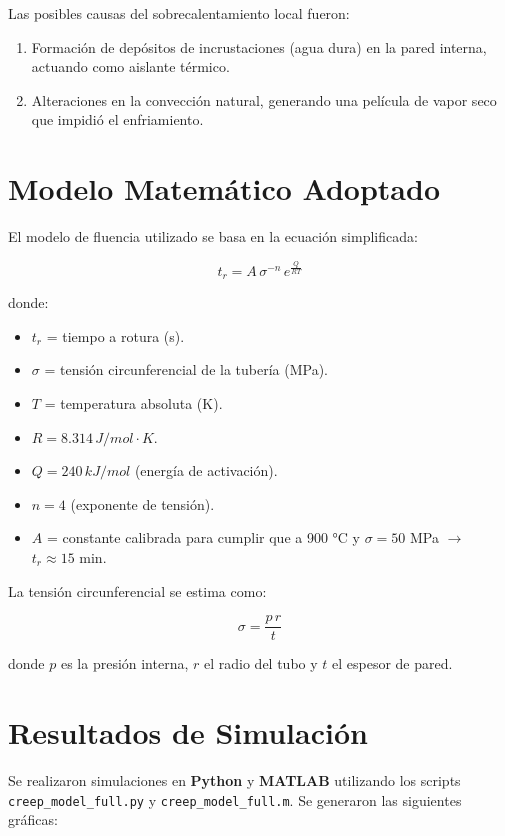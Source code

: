 \documentclass[12pt,a4paper]{article}
\begin{document}
Las posibles causas del sobrecalentamiento local fueron:
\begin{enumerate}
    \item Formación de depósitos de incrustaciones (agua dura) en la pared interna, actuando como aislante térmico.
    \item Alteraciones en la convección natural, generando una película de vapor seco que impidió el enfriamiento.
\end{enumerate}

\section{Modelo Matemático Adoptado}
El modelo de fluencia utilizado se basa en la ecuación simplificada:

\begin{equation}
    t_r = A \, \sigma^{-n} \, e^{\frac{Q}{R T}}
\end{equation}

donde:
\begin{itemize}
    \item $t_r$ = tiempo a rotura (s).
    \item $\sigma$ = tensión circunferencial de la tubería (MPa).
    \item $T$ = temperatura absoluta (K).
    \item $R = 8.314 \, J/mol\cdot K$.
    \item $Q = 240 \, kJ/mol$ (energía de activación).
    \item $n = 4$ (exponente de tensión).
    \item $A$ = constante calibrada para cumplir que a 900 °C y $\sigma=50$ MPa $\rightarrow$ $t_r \approx 15$ min.
\end{itemize}

La tensión circunferencial se estima como:

\begin{equation}
    \sigma = \frac{p \, r}{t}
\end{equation}

donde $p$ es la presión interna, $r$ el radio del tubo y $t$ el espesor de pared.

\section{Resultados de Simulación}
Se realizaron simulaciones en \textbf{Python} y \textbf{MATLAB} utilizando los scripts \texttt{creep\_model\_full.py} y \texttt{creep\_model\_full.m}.
Se generaron las siguientes gráficas:
\end{document}
